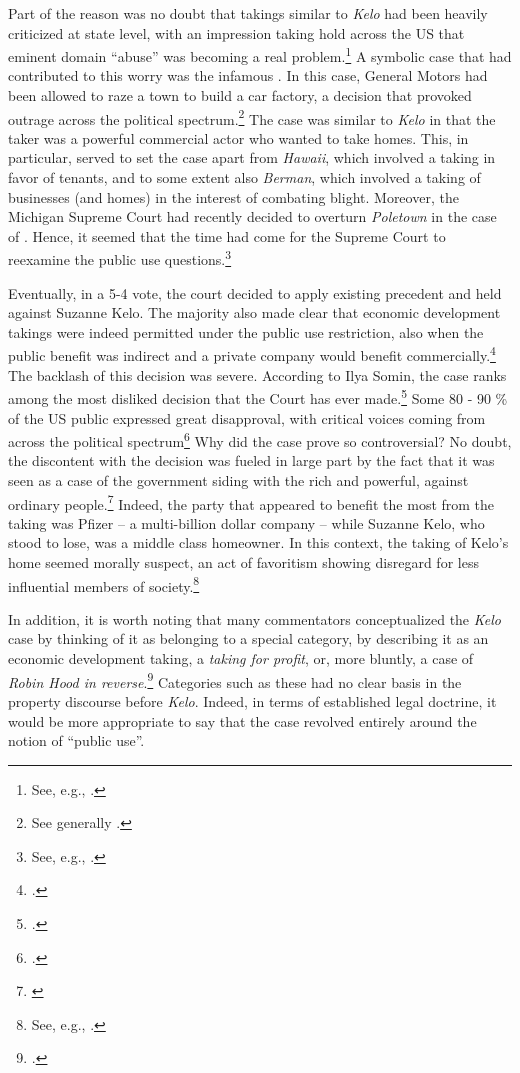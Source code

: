 Part of the reason was no doubt that takings similar to {\it Kelo} had been heavily criticized at state level, with an impression taking hold across the US that eminent domain ``abuse'' was becoming a real problem.\footnote{See, e.g., \cite[667-669]{sandefur05}.} A symbolic case that had contributed to this worry was the infamous \textcite{poletown81}. In this case, General Motors had been allowed to raze a town to build a car factory, a decision that provoked outrage across the political spectrum.\footnote{See generally \cite{sandefur05}.} The case was similar to {\it Kelo} in that the taker was a powerful commercial actor who wanted to take homes. This, in particular, served to set the case apart from  {\it Hawaii}, which involved a taking in favor of tenants, and to some extent also {\it Berman}, which involved a taking of businesses (and homes) in the interest of combating blight. Moreover, the Michigan Supreme Court had recently decided to overturn {\it Poletown} in the case of \textcite{wayne04}. Hence, it seemed that the time had come for the Supreme Court to reexamine the public use questions.\footnote{See, e.g., \cite{sandefur05,claeys04}.}

Eventually, in a 5-4 vote, the court decided to apply existing precedent and held against Suzanne Kelo. The majority also made clear that economic development takings were indeed permitted under the public use restriction, also when the public benefit was indirect and a private company would benefit commercially.\footcite[469-470]{kelo05} The backlash of this decision was severe. According to Ilya Somin, the case ranks among the most disliked decision that the Court has ever made.\footcite[2]{somin11} Some 80 - 90 \% of the US public expressed great disapproval, with critical voices coming from across the political spectrum\footcite[2108-2110]{somin09} Why did the case prove so controversial? No doubt, the discontent with the decision was fueled in large part by the fact that it was seen as a case of the government siding with the rich and powerful, against ordinary people.\footnote{\cite[630-634]{baron07}} Indeed, the party that appeared to benefit the most from the taking was Pfizer -- a multi-billion dollar company -- while Suzanne Kelo, who stood to lose, was a middle class homeowner. In this context, the taking of Kelo's home seemed morally suspect, an act of favoritism showing disregard for less influential members of society.\footnote{See, e.g., \cite{underkuffler06}.}

In addition, it is worth noting that many commentators conceptualized the {\it Kelo} case by thinking of it as belonging to a special category, by describing it as an economic development taking, a {\it taking for profit}, or, more bluntly, a case of {\it Robin Hood in reverse}.\footcite{somin05} Categories such as these had no clear basis in the property discourse before {\it Kelo}. Indeed, in terms of established legal doctrine, it would be more appropriate to say that the case revolved entirely around the notion of ``public use''. 

